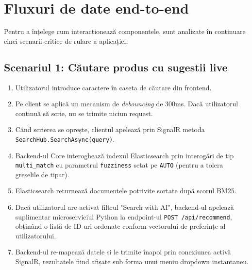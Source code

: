 \section{Fluxuri de date end-to-end}

Pentru a înțelege cum interacționează componentele, sunt analizate în continuare cinci scenarii critice de rulare a aplicației.

\subsection{Scenariul 1: Căutare produs cu sugestii live}
\begin{enumerate}
    \item Utilizatorul introduce caractere în caseta de căutare din frontend.
    \item Pe client se aplică un mecanism de \textit{debouncing} de 300ms. Dacă utilizatorul continuă să scrie, nu se trimite niciun request.
    \item Când scrierea se oprește, clientul apelează prin SignalR metoda \texttt{SearchHub.SearchAsync(query)}.
    \item Backend-ul Core interoghează indexul Elasticsearch prin interogări de tip \texttt{multi\_match} cu parametrul \texttt{fuzziness} setat pe \texttt{AUTO} (pentru a tolera greșelile de tipar).
    \item Elasticsearch returnează documentele potrivite sortate după scorul BM25.
    \item Dacă utilizatorul are activat filtrul "Search with AI", backend-ul apelează suplimentar microserviciul Python la endpoint-ul \texttt{POST /api/recommend}, obținând o listă de ID-uri ordonate conform vectorului de preferințe al utilizatorului.
    \item Backend-ul re-mapează datele și le trimite înapoi prin conexiunea activă SignalR, rezultatele fiind afișate sub forma unui meniu dropdown instantaneu.
\end{enumerate}

